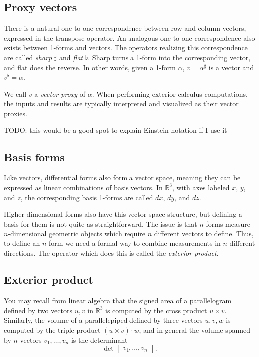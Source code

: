 \documentclass[utf8,english]{gradu3}
\begin{document}
\subsection{Proxy vectors}

There is a natural one-to-one correspondence between row and column vectors,
expressed in the transpose operator.
An analogous one-to-one correspondence also exists between 1-forms and vectors.
The operators realizing this correspondence are called
\textit{sharp} $\sharp$ and \textit{flat} $\flat$.
Sharp turns a 1-form into the corresponding vector,
and flat does the reverse.
In other words, given a 1-form $\alpha$,
$v = \alpha^{\sharp}$ is a vector and $v^{\flat} = \alpha$.

We call $v$ a \textit{vector proxy} of $\alpha$.
When performing exterior calculus computations,
the inputs and results are typically interpreted
and visualized as their vector proxies.

TODO: this would be a good spot to explain Einstein notation if I use it

\subsection{Basis forms}

Like vectors, differential forms also form a vector space,
meaning they can be expressed as linear combinations of basis vectors.
In $\mathbb{R}^3$, with axes labeled $x$, $y$, and $z$,
the corresponding basis 1-forms are called $dx$, $dy$, and $dz$.

Higher-dimensional forms also have this vector space structure,
but defining a basis for them is not quite as straightforward.
The issue is that $n$-forms measure $n$-dimensional geometric objects
which require $n$ different vectors to define.
Thus, to define an $n$-form we need a formal way to combine
measurements in $n$ different directions.
The operator which does this is called the \textit{exterior product}.

\subsection{Exterior product}

You may recall from linear algebra that the signed area of a parallelogram
defined by two vectors $u,v$ in $\mathbb{R}^3$ is computed
by the cross product $u \times v$.
Similarly, the volume of a parallelepiped defined by three vectors $u,v,w$
is computed by the triple product $(u \times v) \cdot w$,
and in general the volume spanned by $n$ vectors $v_1, \dots, v_n$
is the determinant
\[
  \det \begin{bmatrix}
    v_1, \dots, v_n
  \end{bmatrix}.
\]
\end{document}
